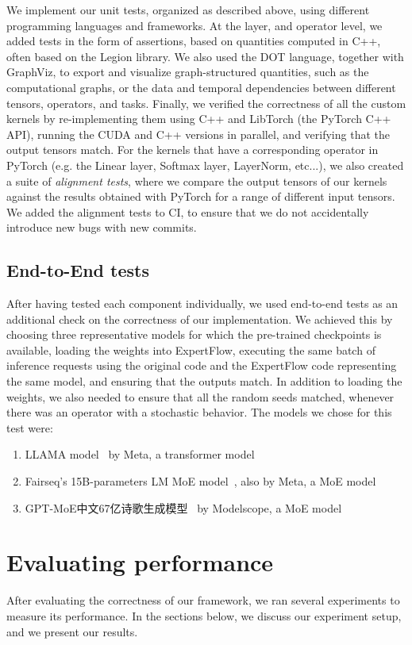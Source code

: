 We implement our unit tests, organized as described above, using different programming languages and frameworks. At the layer, and operator level, we added tests in the form of assertions, based on quantities computed in C++, often based on the Legion library. We also used the DOT language, together with GraphViz, to export and visualize graph-structured quantities, such as the computational graphs, or the data and temporal dependencies between different tensors, operators, and tasks. Finally, we verified the correctness of all the custom kernels by re-implementing them using C++ and LibTorch (the PyTorch C++ API), running the CUDA and C++ versions in parallel, and verifying that the output tensors match. For the kernels that have a corresponding operator in PyTorch (e.g. the Linear layer, Softmax layer, LayerNorm, etc...), we also created a suite of \textit{alignment tests}, where we compare the output tensors of our kernels against the results obtained with PyTorch for a range of different input tensors. We added the alignment tests to CI, to ensure that we do not accidentally introduce new bugs with new commits.

\subsection{End-to-End tests}
After having tested each component individually, we used end-to-end tests as an additional check on the correctness of our implementation. We achieved this by choosing three representative models for which the pre-trained checkpoints is available, loading the weights into ExpertFlow, executing the same batch of inference requests using the original code and the ExpertFlow code representing the same model, and ensuring that the outputs match. In addition to loading the weights, we also needed to ensure that all the random seeds matched, whenever there was an operator with a stochastic behavior. The models we chose for this test were:
\begin{enumerate}
    \item LLAMA model~\cite{touvron2023llama} by Meta, a transformer model
    \item Fairseq’s 15B-parameters LM MoE model~\cite{fairseq-moe-model}, also by Meta, a MoE model
    \item GPT-MoE中文67亿诗歌生成模型~\cite{modelscope-checkpoint} by Modelscope, a MoE model
\end{enumerate}

\section{Evaluating performance}\label{eval-performance}
After evaluating the correctness of our framework, we ran several experiments to measure its performance. In the sections below, we discuss our experiment setup, and we present our results.

